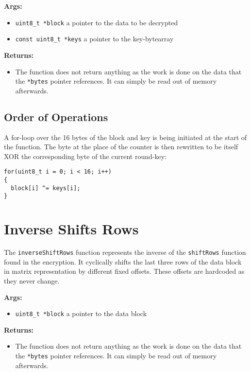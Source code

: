 \textbf{Args:}
\begin{itemize}
  \item \lstinline{uint8_t *block} a pointer to the data to be decrypted
  \item \lstinline{const uint8_t *keys} a pointer to the key-bytearray
\end{itemize}

\textbf{Returns:}
\begin{itemize}
  \item The function does not return anything as the work is done on the data that the \lstinline{*bytes} pointer references. It can simply be read out of memory afterwards.
\end{itemize}

\subsection{Order of Operations}
A for-loop over the 16 bytes of the block and key is being initiated at the start of the function. The byte at the place of the counter is then rewritten to be itself \ac{XOR} the corresponding byte of the current round-key:

\begin{lstlisting}
for(uint8_t i = 0; i < 16; i++)
{
  block[i] ^= keys[i];
}
\end{lstlisting}


\section{Inverse Shifts Rows}
\label{ch:dec_inverseshiftrows}

The \lstinline{inverseShiftRows} function represents the inverse of the \lstinline{shiftRows} function found in the encryption. It cyclically shifts the last three rows of the data block in matrix representation by different fixed offsets. These offsets are hardcoded as they never change.

\textbf{Args:}
\begin{itemize}
  \item \lstinline{uint8_t *block} a pointer to the data block
\end{itemize}

\textbf{Returns:}
\begin{itemize}
  \item The function does not return anything as the work is done on the data that the \lstinline{*bytes} pointer references. It can simply be read out of memory afterwards.
\end{itemize}


